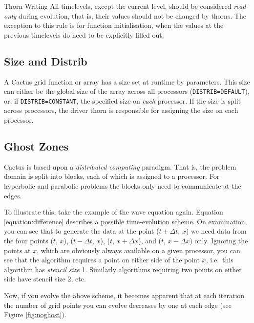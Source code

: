 \begin{cactuspart}{Thorn Writing}
All timelevels, except the current level, should be considered \emph{read-only} during evolution, that is, their values should not be changed by thorns.
The exception to this rule is for function initialisation, when the
values at the previous timelevels do need to be explicitly filled out.


\subsection{Size and Distrib}

A Cactus grid function or array has a size set at runtime by parameters.
This size can either be the global size of the array across all processors
(\texttt{DISTRIB=DEFAULT}),
or, if \texttt{DISTRIB=CONSTANT}, the specified
size on \emph{each} processor.
If the size is split across processors, the driver thorn is
responsible for assigning the size on each processor.


\subsection{Ghost Zones}
\label{sec:ghost_size}

Cactus is based upon a \textit{distributed computing} paradigm.  That is,
the problem domain is split into blocks, each of which is assigned to
a processor.  For hyperbolic and parabolic problems the blocks only
need to communicate at the edges.

To illustrate this, take the example of the wave equation again.
Equation \ref{equation:difference} describes a possible time-evolution
scheme.  On examination, you can see that to generate the data at the
point ($t+\Delta t$, $x$) we need data from the four points ($t$,
$x$), ($t-\Delta t$, $x$), ($t$, $x+\Delta x$), and ($t$, $x-\Delta x$)
only.  Ignoring the points at $x$, which are obviously always
available on a given processor, you can see that the algorithm
requires a point on either side of the point $x$, i.e.\ this algorithm
has \textit{stencil size} 1.  Similarly algorithms requiring two points
on either side have stencil size 2, etc.

Now, if you evolve the above scheme, it becomes apparent that at each
iteration the number of grid points you can evolve decreases by one at
each edge (see Figure \ref{fig:noghost}).


\end{cactuspart}
